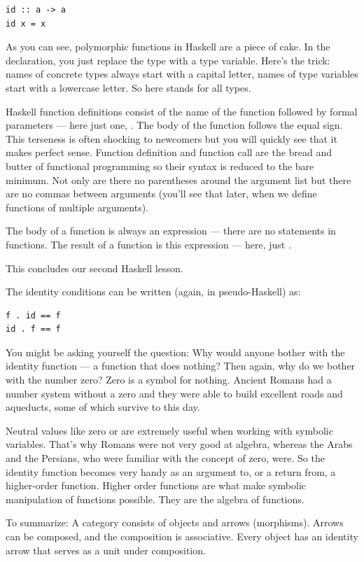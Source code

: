 \begin{Verbatim}
id :: a -> a
id x = x
\end{Verbatim}
As you can see, polymorphic functions in Haskell are a piece of cake. In
the declaration, you just replace the type with a type variable. Here's
the trick: names of concrete types always start with a capital letter,
names of type variables start with a lowercase letter. So here
 stands for all types.

Haskell function definitions consist of the name of the function
followed by formal parameters --- here just one, . The body of
the function follows the equal sign. This terseness is often shocking to
newcomers but you will quickly see that it makes perfect sense. Function
definition and function call are the bread and butter of functional
programming so their syntax is reduced to the bare minimum. Not only are
there no parentheses around the argument list but there are no commas
between arguments (you'll see that later, when we define functions of
multiple arguments).

The body of a function is always an expression --- there are no
statements in functions. The result of a function is this expression ---
here, just .

This concludes our second Haskell lesson.

The identity conditions can be written (again, in pseudo-Haskell) as:

\begin{Verbatim}
f . id == f
id . f == f
\end{Verbatim}
You might be asking yourself the question: Why would anyone bother with
the identity function --- a function that does nothing? Then again, why
do we bother with the number zero? Zero is a symbol for nothing. Ancient
Romans had a number system without a zero and they were able to build
excellent roads and aqueducts, some of which survive to this day.

Neutral values like zero or  are extremely useful when
working with symbolic variables. That's why Romans were not very good at
algebra, whereas the Arabs and the Persians, who were familiar with the
concept of zero, were. So the identity function becomes very handy as an
argument to, or a return from, a higher-order function. Higher order
functions are what make symbolic manipulation of functions possible.
They are the algebra of functions.

To summarize: A category consists of objects and arrows (morphisms).
Arrows can be composed, and the composition is associative. Every object
has an identity arrow that serves as a unit under composition.

